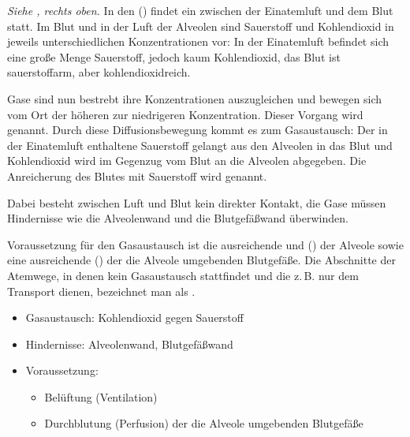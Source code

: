 {
\emph{Siehe 
, rechts
oben.} In den  () findet ein
 zwischen der
Einatemluft und dem Blut statt. 
%
Im Blut und in der Luft der Alveolen sind 
Sauerstoff 
und Kohlendioxid 
in jeweils unterschiedlichen Konzentrationen vor:
%
In der Einatemluft befindet sich eine große Menge 
Sauerstoff, 
jedoch kaum Kohlendioxid, 
das Blut ist sauerstoffarm, 
aber kohlendioxidreich.
%

Gase sind nun bestrebt 
ihre Konzentrationen auszugleichen
und bewegen sich vom Ort der höheren 
zur niedrigeren Konzentration.
%
Dieser Vorgang wird  genannt.
%
Durch diese Diffusionsbewegung kommt es zum Gasaustausch:
%
Der in der Einatemluft enthaltene Sauerstoff gelangt aus
den Alveolen 
in das Blut 
und Kohlendioxid wird im Gegenzug
vom Blut 
an die Alveolen abgegeben.
%
Die Anreicherung des Blutes mit Sauerstoff wird  genannt.

%
Dabei besteht zwischen Luft und Blut kein direkter Kontakt,
die Gase müssen Hindernisse wie die Alveolenwand
und die Blutgefäßwand 
überwinden.   

Voraussetzung für den Gasaustausch ist die ausreichende
 und  () 
der Alveole 
sowie eine ausreichende  () 
\label{topic:lungenperfusion}
der die Alveole umgebenden Blutgefäße.
%
Die Abschnitte der Atemwege, 
in denen kein Gasaustausch
stattfindet 
und die z.\,B. nur dem Transport dienen, 
bezeichnet man
als .
}
{
\begin{itemize}
  \item Gasaustausch: Kohlendioxid gegen Sauerstoff
  \item Hindernisse: Alveolenwand, Blutgefäßwand
  \item Voraussetzung: 
  \begin{itemize}
    \item Belüftung (Ventilation)
    \item Durchblutung (Perfusion) der die Alveole umgebenden Blutgefäße
  \end{itemize}
\end{itemize}
}{}{}{}

